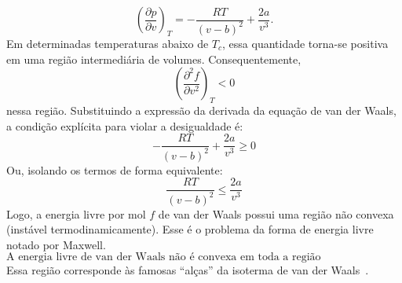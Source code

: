\documentclass[11pt,a4paper]{article}
\newcommand{\pd}[2]{\frac{\partial #1}{\partial #2}}
\newcommand{\pdd}[2]{\frac{\partial^2 #1}{\partial #2^2}}
\begin{document}
%
\begin{equation}
    \left(\pd{p}{v}\right)_T
    =
    -\frac{RT}{(v-b)^2}
    +
    \frac{2a}{v^3}.
\end{equation}
%
Em determinadas temperaturas abaixo de $T_c$, essa quantidade torna-se
positiva em uma região intermediária de volumes. Consequentemente,
%
\begin{equation}
    \left(\pdd{f}{v}\right)_T<0
\end{equation}
%
nessa região. Substituindo a expressão da derivada da equação de van der Waals, a condição explícita para violar a desigualdade é:
%
\begin{equation}
    -\frac{RT}{(v-b)^2} + \frac{2a}{v^3} \geq 0
\end{equation}
%
Ou, isolando os termos de forma equivalente:
%
\begin{equation}
    \frac{RT}{(v-b)^2} \leq \frac{2a}{v^3}
\end{equation}
%
Logo, a energia livre por mol $f$ de van der Waals possui uma região não convexa (instável termodinamicamente). Esse é o problema da forma de energia livre notado por Maxwell.
%
\begin{equation*}
    \boxed{
    \text{A energia livre de van der Waals não é convexa em toda a região
    termodinamicamente acessível.}
    }
\end{equation*}
%
Essa região corresponde às famosas ``alças'' da isoterma de van der Waals~\cite{salinas}.
\end{document}
